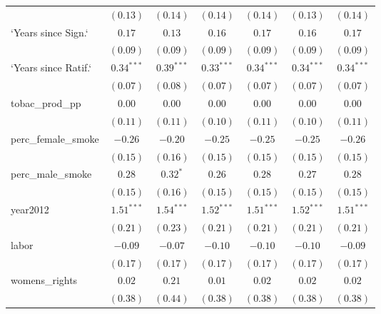 \begin{table}[!h]
\begin{center}
\begin{tabular}{l c c c c c c }
                        & $(0.13)$     & $(0.14)$     & $(0.14)$     & $(0.14)$     & $(0.13)$     & $(0.14)$     \\
`Years since Sign.`     & $0.17$       & $0.13$       & $0.16$       & $0.17$       & $0.16$       & $0.17$       \\
                        & $(0.09)$     & $(0.09)$     & $(0.09)$     & $(0.09)$     & $(0.09)$     & $(0.09)$     \\
`Years since Ratif.`    & $0.34^{***}$ & $0.39^{***}$ & $0.33^{***}$ & $0.34^{***}$ & $0.34^{***}$ & $0.34^{***}$ \\
                        & $(0.07)$     & $(0.08)$     & $(0.07)$     & $(0.07)$     & $(0.07)$     & $(0.07)$     \\
tobac\_prod\_pp         & $0.00$       & $0.00$       & $0.00$       & $0.00$       & $0.00$       & $0.00$       \\
                        & $(0.11)$     & $(0.11)$     & $(0.10)$     & $(0.11)$     & $(0.10)$     & $(0.11)$     \\
perc\_female\_smoke     & $-0.26$      & $-0.20$      & $-0.25$      & $-0.25$      & $-0.25$      & $-0.26$      \\
                        & $(0.15)$     & $(0.16)$     & $(0.15)$     & $(0.15)$     & $(0.15)$     & $(0.15)$     \\
perc\_male\_smoke       & $0.28$       & $0.32^{*}$   & $0.26$       & $0.28$       & $0.27$       & $0.28$       \\
                        & $(0.15)$     & $(0.16)$     & $(0.15)$     & $(0.15)$     & $(0.15)$     & $(0.15)$     \\
year2012                & $1.51^{***}$ & $1.54^{***}$ & $1.52^{***}$ & $1.51^{***}$ & $1.52^{***}$ & $1.51^{***}$ \\
                        & $(0.21)$     & $(0.23)$     & $(0.21)$     & $(0.21)$     & $(0.21)$     & $(0.21)$     \\
labor                   & $-0.09$      & $-0.07$      & $-0.10$      & $-0.10$      & $-0.10$      & $-0.09$      \\
                        & $(0.17)$     & $(0.17)$     & $(0.17)$     & $(0.17)$     & $(0.17)$     & $(0.17)$     \\
womens\_rights          & $0.02$       & $0.21$       & $0.01$       & $0.02$       & $0.02$       & $0.02$       \\
                        & $(0.38)$     & $(0.44)$     & $(0.38)$     & $(0.38)$     & $(0.38)$     & $(0.38)$     \\

\end{tabular}
\end{center}
\end{table}

